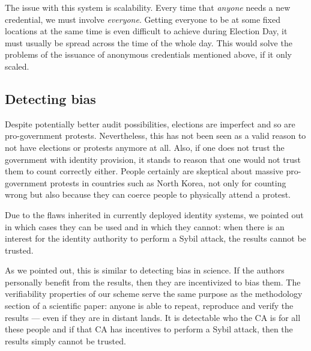 The issue with this system is scalability.
Every time that \emph{anyone} needs a new credential, we must involve 
\emph{everyone}.
Getting everyone to be at some fixed locations at the same time is even 
difficult to achieve during Election Day, it must usually be spread across the 
time of the whole day.
This would solve the problems of the issuance of anonymous credentials 
mentioned above, if it only scaled.


\subsection{Detecting bias}


Despite potentially better audit possibilities, elections are imperfect and so are pro-government protests. Nevertheless, this has not been seen as a valid reason to not have elections or protests anymore at all. Also, if one does not trust the government with identity provision, it stands to reason that one would not trust them to count correctly either. People certainly are skeptical about massive pro-government protests in countries such as North Korea, not only for counting wrong but also because they can coerce people to physically attend a protest.

Due to the flaws inherited in currently deployed identity systems, we 
pointed out in which cases they can be used and in which they cannot: 
when there is an interest for the identity authority to perform a 
Sybil attack, the results cannot be trusted.

As we pointed out, this is similar to detecting bias in science. If the 
authors personally benefit from the results, then they are incentivized 
to bias them. The verifiability properties of our scheme serve the same 
purpose as the methodology section of a scientific paper: anyone is able 
to repeat, reproduce and verify the results --- even if they are in 
distant lands. It is detectable who the CA is for all these people and 
if that CA has incentives to perform a Sybil attack, then the results 
simply cannot be trusted.

